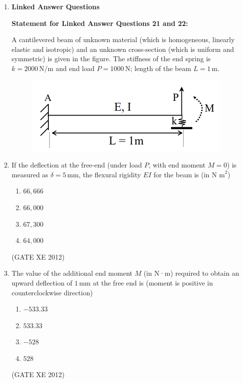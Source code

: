 \documentclass[12pt]{article}
\begin{document}
\begin{enumerate}
\begin{multicols}{4}
\begin{enumerate}
\item $4.92 \, \text{mm}$
\item $4.58 \, \text{mm}$
\item $9.31 \, \text{mm}$
\item $9.84 \, \text{mm}$
\end{enumerate}
\end{multicols}
(GATE XE 2012)

\item[] {\large \textbf{Linked Answer Questions}}

\textbf{Statement for Linked Answer Questions 21 and 22:}  

A cantilevered beam of unknown material (which is homogeneous, linearly elastic and isotropic) and an unknown cross-section (which is uniform and symmetric) is given in the figure. The stiffness of the end spring is $k = 2000 \, \text{N/m}$ and end load $P = 1000 \, \text{N}$; length of the beam $L = 1 \, \text{m}$. 

\begin{figure}[H]
    \centering
    \includegraphics[width=0.5\columnwidth]{figs/ass2_d_q21.png}
    \caption{}
    \label{fig:placeholder}
\end{figure}

\item If the deflection at the free-end (under load $P$, with end moment $M=0$) is measured as $\delta = 5 \, \text{mm}$, the flexural rigidity $EI$ for the beam is (in $\text{N m}^2$)

\begin{multicols}{4}
\begin{enumerate}
\item $66,666$
\item $66,000$
\item $67,300$
\item $64,000$
\end{enumerate}
\end{multicols}
(GATE XE 2012)

\item The value of the additional end moment $M$ (in N·m) required to obtain an upward deflection of $1 \, \text{mm}$ at the free end is (moment is positive in counterclockwise direction)  

\begin{multicols}{4}
\begin{enumerate}
\item $-533.33$
\item $533.33$
\item $-528$
\item $528$
\end{enumerate}
\end{multicols}
(GATE XE 2012)


\end{enumerate}
\end{document}
